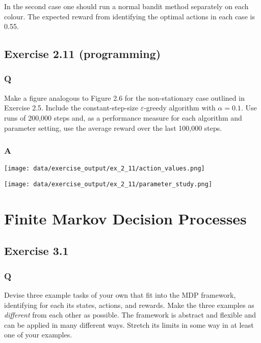 In the second case one should run a normal bandit method separately on each colour. The expected reward from identifying the optimal actions in each case is 0.55.

\subsection{Exercise 2.11 (programming)}
\subsubsection{Q}
Make a figure analogous to Figure 2.6 for the non-stationary case outlined in Exercise 2.5. Include the constant-step-size $\varepsilon$-greedy algorithm with $\alpha=0.1$. Use runs of 200,000 steps and, as a performance measure for each algorithm and parameter setting, use the average reward over the last 100,000 steps.

\subsubsection{A}
\ProgrammingExercise

\texttt{[image: data/exercise\_output/ex\_2\_11/action\_values.png]}

\texttt{[image: data/exercise\_output/ex\_2\_11/parameter\_study.png]}


\clearpage
\section{Finite Markov Decision Processes}

\subsection{Exercise 3.1}
\subsubsection{Q}
Devise three example tasks of your own that fit into the MDP framework, identifying for each its states, actions, and rewards. Make the three examples as \emph{different} from each other as possible. The framework is abstract and flexible and can be applied in many different ways. Stretch its limits in some way in at least one of your examples.


